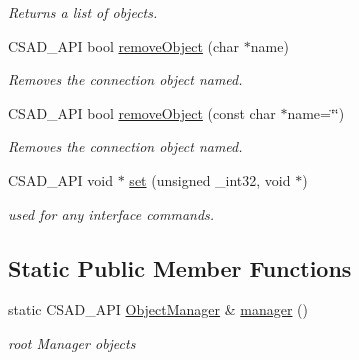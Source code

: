 \begin{DoxyCompactItemize}
\begin{DoxyCompactList}\small\item\em Returns a list of objects. \end{DoxyCompactList}\item 
\hypertarget{classcsad_1_1_object_manager_a69bf8143179b0ee6ae5554f212e64077}{C\-S\-A\-D\-\_\-\-A\-P\-I bool \hyperlink{classcsad_1_1_object_manager_a69bf8143179b0ee6ae5554f212e64077}{remove\-Object} (char $\ast$name)}\label{classcsad_1_1_object_manager_a69bf8143179b0ee6ae5554f212e64077}

\begin{DoxyCompactList}\small\item\em Removes the connection object named. \end{DoxyCompactList}\item 
\hypertarget{classcsad_1_1_object_manager_a1a5ae637929f9a0b75fe5744108fd1d1}{C\-S\-A\-D\-\_\-\-A\-P\-I bool \hyperlink{classcsad_1_1_object_manager_a1a5ae637929f9a0b75fe5744108fd1d1}{remove\-Object} (const char $\ast$name=\char`\"{}\char`\"{})}\label{classcsad_1_1_object_manager_a1a5ae637929f9a0b75fe5744108fd1d1}

\begin{DoxyCompactList}\small\item\em Removes the connection object named. \end{DoxyCompactList}\item 
\hypertarget{classcsad_1_1_object_manager_a16539e67e32f91a63432e89e30d4f30b}{C\-S\-A\-D\-\_\-\-A\-P\-I void $\ast$ \hyperlink{classcsad_1_1_object_manager_a16539e67e32f91a63432e89e30d4f30b}{set} (unsigned \-\_\-int32, void $\ast$)}\label{classcsad_1_1_object_manager_a16539e67e32f91a63432e89e30d4f30b}

\begin{DoxyCompactList}\small\item\em used for any interface commands. \end{DoxyCompactList}\end{DoxyCompactItemize}
\subsection*{Static Public Member Functions}
\begin{DoxyCompactItemize}
\item 
\hypertarget{classcsad_1_1_object_manager_aedaeff827696471cc324b42b5f63cedd}{static C\-S\-A\-D\-\_\-\-A\-P\-I \hyperlink{classcsad_1_1_object_manager}{Object\-Manager} \& \hyperlink{classcsad_1_1_object_manager_aedaeff827696471cc324b42b5f63cedd}{manager} ()}\label{classcsad_1_1_object_manager_aedaeff827696471cc324b42b5f63cedd}

\begin{DoxyCompactList}\small\item\em root Manager objects \end{DoxyCompactList}\end{DoxyCompactItemize}
